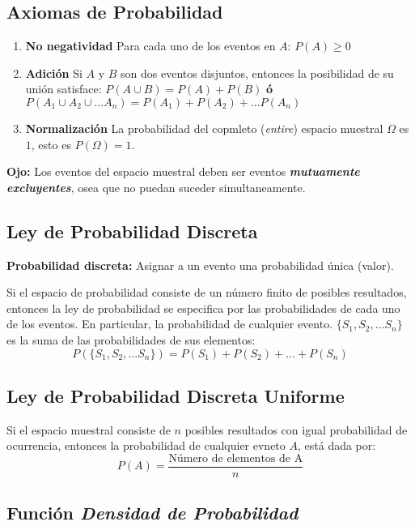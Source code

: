 \documentclass[]{book}
\providecommand{\tightlist}{%
  \setlength{\itemsep}{0pt}\setlength{\parskip}{0pt}}
\begin{document}
\subsection{Axiomas de Probabilidad}\label{axiomas-de-probabilidad-1}

\begin{enumerate}
\def\labelenumi{\arabic{enumi}.}
\tightlist
\item
  \textbf{No negatividad} Para cada uno de los eventos en \(A\):
  \(P(A) \geq 0\)
\item
  \textbf{Adición} Si \(A\) y \(B\) son dos eventos disjuntos, entonces
  la posibilidad de su unión satisface: \(P(A \cup B) = P(A)+P(B)\)
  \textbf{ó} \(P(A_1\cup A_2 \cup ...A_n) = P(A_1) + P(A_2)+...P(A_n)\)
\item
  \textbf{Normalización} La probabilidad del copmleto (\emph{entire})
  espacio muestral \(\Omega\) es \(1\), esto es \(P(\Omega) = 1\).
\end{enumerate}

 \textbf{Ojo:} Los eventos del espacio muestral deben ser eventos
\textbf{\emph{mutuamente excluyentes}}, osea que no puedan suceder
simultaneamente.

\subsection{Ley de Probabilidad
Discreta}\label{ley-de-probabilidad-discreta-1}

\textbf{Probabilidad discreta:} Asignar a un evento una probabilidad
única (valor).

Si el espacio de probabilidad consiste de un número finito de posibles
resultados, entonces la ley de probabilidad se especifica por las
probabilidades de cada uno de los eventos. En particular, la
probabilidad de cualquier evento. \(\{S_1,S_2,...S_n\}\) es la suma de
las probabilidades de sus elementos:
\[P(\{S_1,S_2,...S_n\}) = P(S_1)+P(S_2)+...+P(S_n)\]

\subsection{Ley de Probabilidad Discreta
Uniforme}\label{ley-de-probabilidad-discreta-uniforme-1}

Si el espacio muestral consiste de \(n\) posibles resultados con igual
probabilidad de ocurrencia, entonces la probabilidad de cualquier evneto
\(A\), está dada por:
\[P(A)= \frac{\text{Número de elementos de A}}{n}\]

\subsection{\texorpdfstring{Función \emph{Densidad de
Probabilidad}}{Función Densidad de Probabilidad}}\label{funcion-densidad-de-probabilidad-1}
\end{document}
